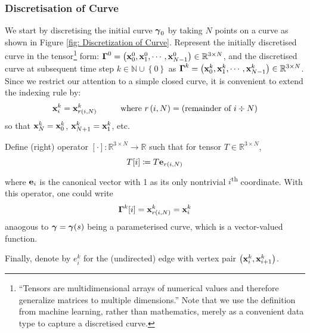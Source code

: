 \documentclass[../dissertation.tex]{subfiles}
\begin{document}
\subsubsection{Discretisation of Curve}
We start by discretising the initial curve $\boldsymbol{\gamma}_0$ by taking $N$ points on a curve as shown in Figure \ref{fig: Discretization of Curve}.
Represent the initially discretised curve in the tensor\footnote{``Tensors are multidimensional arrays of numerical values and therefore generalize matrices to multiple dimensions.''\cite{https://doi.org/10.48550/arxiv.1711.10781} Note that we use the definition from machine learning,
rather than mathematics, merely as a convenient data type to capture a discretised curve.}
form: $\boldsymbol{\Gamma}^0 = \left( \mathbf{x}_0^0, \mathbf{x}_1^0, \cdots, \mathbf{x}_{N-1}^0 \right) \in \mathbb{R}^{3 \times N}$,
and the discretised curve at subsequent time step $k \in \mathbb{N} \cup \left\{ 0 \right\}$ as $\boldsymbol{\Gamma}^k = \left( \mathbf{x}_0^k, \mathbf{x}_1^k, \cdots, \mathbf{x}_{N-1}^k \right) \in \mathbb{R}^{3 \times N}$.
Since we restrict our attention to a simple closed curve, it is convenient to extend the indexing rule by:
\begin{equation}
    \mathbf{x}_{i}^k = \mathbf{x}_{r\left( i,N \right)}^k \hspace{1cm} \text{where } r\left( i,N \right) = \text{(remainder of } i \div N \text{)}
\end{equation}
so that $\mathbf{x}_N^k = \mathbf{x}_{0}^k$, $\mathbf{x}_{N+1}^k = \mathbf{x}_{1}^k$, etc.

Define (right) operator $[\cdot]:\mathbb{R}^{3 \times N} \rightarrow \mathbb{R}$ such that for tensor $T \in \mathbb{R}^{3 \times N}$,
\begin{equation*}
    T[i] \coloneqq T \mathbf{e}_{r\left( i,N \right)}
\end{equation*}
where $\mathbf{e}_i$ is the canonical vector with 1 as its only nontrivial $i$\textsuperscript{th} coordinate.
With this operator, one could write
\begin{equation}
    \boldsymbol{\Gamma}^k [i] = \mathbf{x}_{r\left( i, N \right)}^k = \mathbf{x}_i^k
\end{equation}
anaogous to $\boldsymbol{\gamma} = \boldsymbol{\gamma}(s)$ being a parameterised curve, which is a vector-valued function.

Finally, denote by $e_{i}^k$ for the (undirected) edge with vertex pair $\left( \mathbf{x}_i^k, \mathbf{x}_{i+1}^k \right)$.
\end{document}
